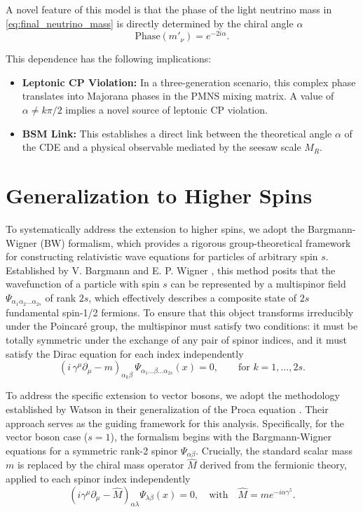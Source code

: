 A novel feature of this model is that the phase of the light neutrino
mass in \eqref{eq:final_neutrino_mass} is directly determined by the chiral
angle $\alpha$
\begin{equation}
  \text{Phase}\left(m'_{\nu}\right) = e^{-2i\alpha}.
\end{equation}

This dependence has the following implications:
\begin{itemize}
  \item \textbf{Leptonic CP Violation:} In a three-generation scenario, this
    complex phase translates into Majorana phases in the PMNS mixing matrix. A
    value of $\alpha \neq k\pi/2$ implies a novel source of leptonic CP
    violation.
  \item \textbf{BSM Link:} This establishes a direct link between the
    theoretical angle $\alpha$ of the CDE and a physical observable mediated by
    the seesaw scale $M_R$.
\end{itemize}
\section{Generalization to Higher Spins}
\label{sec:HigherSpins}

To systematically address the extension to higher spins, we adopt the
Bargmann-Wigner (BW) formalism, which provides a rigorous group-theoretical
framework for constructing relativistic wave equations for particles of
arbitrary spin $s$. Established by V. Bargmann and E. P. Wigner
\cite{bargmannGroupTheoreticalDiscussion1997}, this method posits that the wavefunction of a particle
with spin $s$ can be represented by a multispinor field $\Psi_{\alpha_1 \alpha_2
\dots \alpha_{2s}}$ of rank $2s$, which effectively describes a composite state
of $2s$ fundamental spin-1/2 fermions. To ensure that this object transforms
irreducibly under the Poincar\'{e} group, the multispinor must satisfy two
conditions: it must be totally symmetric under the exchange of any pair of
spinor indices, and it must satisfy the Dirac equation for each index
independently
\begin{equation}
  \left( i\,\gamma^\mu \partial_\mu - m \right)_{\alpha_k \beta}\,
  \Psi_{\alpha_1 \dots \beta \dots \alpha_{2s}}(x)
  = 0,
  \qquad \text{for } k = 1, \dots, 2s .
\end{equation}

To address the specific extension to vector bosons, we adopt the methodology
established by Watson in their generalization of the Proca equation
\cite{Watson2022}. Their approach serves as the guiding framework for this
analysis. Specifically, for the vector boson case ($s=1$), the formalism begins
with the Bargmann-Wigner equations for a symmetric rank-2 spinor
$\Psi_{\alpha\beta}$. Crucially, the standard scalar mass $m$ is replaced by the
chiral mass operator $\hat{M}$ derived from the fermionic theory, applied to
each spinor index independently
\begin{equation}
  \left(i \gamma^\mu \partial_\mu - \hat{M}\right)_{\alpha \lambda}
  \Psi_{\lambda \beta}(x) = 0, \quad \text{with} \quad \hat{M} = m
  e^{-i\alpha\gamma^5}.
\end{equation}

